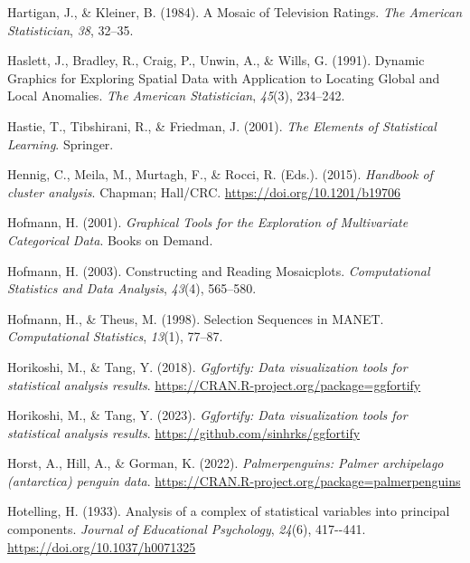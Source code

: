 \documentclass[
  letterpaper,
]{krantz}
\newlength{\cslhangindent}
\newlength{\cslentryspacingunit} %
\newenvironment{CSLReferences}[2] %
 {%
  \setlength{\parindent}{0pt}
  \ifodd #1
  \let\oldpar\par
  \def\par{\hangindent=\cslhangindent\oldpar}
  \fi
  \setlength{\parskip}{#2\cslentryspacingunit}
 }%
 {}
\begin{document}
\begin{CSLReferences}{1}{0}
\leavevmode{}%
Hartigan, J., \& Kleiner, B. (1984). A {M}osaic of {T}elevision
{R}atings. \emph{The American Statistician}, \emph{38}, 32--35.

\leavevmode{}%
Haslett, J., Bradley, R., Craig, P., Unwin, A., \& Wills, G. (1991).
{D}ynamic {G}raphics for {E}xploring {S}patial {D}ata with {A}pplication
to {L}ocating {G}lobal and {L}ocal {A}nomalies. \emph{The American
Statistician}, \emph{45}(3), 234--242.

\leavevmode{}%
Hastie, T., Tibshirani, R., \& Friedman, J. (2001). \emph{The {E}lements
of {S}tatistical {L}earning}. Springer.

\leavevmode{}%
Hennig, C., Meila, M., Murtagh, F., \& Rocci, R. (Eds.). (2015).
\emph{Handbook of cluster analysis}. Chapman; Hall/{CRC}.
\url{https://doi.org/10.1201/b19706}

\leavevmode{}%
Hofmann, H. (2001). \emph{Graphical {T}ools for the {E}xploration of
{M}ultivariate {C}ategorical {D}ata}. Books on Demand.

\leavevmode{}%
Hofmann, H. (2003). Constructing and {R}eading {M}osaicplots.
\emph{Computational Statistics and Data Analysis}, \emph{43}(4),
565--580.

\leavevmode{}%
Hofmann, H., \& Theus, M. (1998). Selection {S}equences in {MANET}.
\emph{Computational Statistics}, \emph{13}(1), 77--87.

\leavevmode{}%
Horikoshi, M., \& Tang, Y. (2018). \emph{Ggfortify: Data visualization
tools for statistical analysis results}.
\url{https://CRAN.R-project.org/package=ggfortify}

\leavevmode{}%
Horikoshi, M., \& Tang, Y. (2023). \emph{Ggfortify: Data visualization
tools for statistical analysis results}.
\url{https://github.com/sinhrks/ggfortify}

\leavevmode{}%
Horst, A., Hill, A., \& Gorman, K. (2022). \emph{Palmerpenguins: Palmer
archipelago (antarctica) penguin data}.
\url{https://CRAN.R-project.org/package=palmerpenguins}

\leavevmode{}%
Hotelling, H. (1933). Analysis of a complex of statistical variables
into principal components. \emph{Journal of Educational Psychology},
\emph{24}(6), 417-\/-441. \url{https://doi.org/10.1037/h0071325}


\end{CSLReferences}
\end{document}
